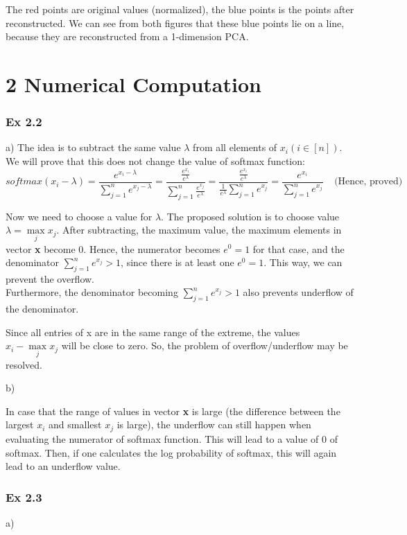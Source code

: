 \documentclass{article}
\begin{document}
\newpage
The red points are original values (normalized), the blue points is the points after reconstructed. We can see from both figures that these blue points lie on a line, because they are reconstructed from a 1-dimension PCA.

\section*{2 Numerical Computation}
\subsubsection*{Ex 2.2}
a)
The idea is to subtract the same value $\lambda$ from all elements of $x_i (i \in [n])$. We will prove that this does not change the value of softmax function:
$$softmax(x_i - \lambda) = \frac{e^{x_i - \lambda}}{\sum\limits_{j=1}^{n}e^{x_j - \lambda}} = \frac{\frac{e^{x_i}}{e^{\lambda}}}{\sum\limits_{j=1}^{n}\frac{e^{x_j}}{e^{\lambda}}} = \frac{\frac{e^{x_i}}{e^{\lambda}}}{\frac{1}{e^{\lambda}} \sum\limits_{j=1}^{n}e^{x_j}} = \frac{e^{x_i}}{\sum\limits_{j=1}^{n}e^{x_j}}\ \ \ \ \ \text{(Hence, proved)}$$

Now we need to choose a value for $\lambda$. The proposed solution is to choose value $\lambda = \max\limits_{j}x_{j}$. After subtracting, the maximum value, the maximum elements in vector \textbf{x} become 0. Hence, the numerator becomes $e^0=1$ for that case, and the denominator $\sum\limits_{j=1}^{n}e^{x_j} > 1$, since there is at least one $e^0 = 1$. This way, we can prevent the overflow. \\
Furthermore, the denominator becoming $\sum\limits_{j=1}^{n}e^{x_j} > 1$ also prevents underflow of the denominator.

Since all entries of x are in the same range of the extreme, the values $x_{i} -\max\limits_{j}x_{j}$ will be close to zero. So, the problem of overflow/underflow may be resolved. 

b)

In case that the range of values in vector \textbf{x} is large (the difference between the largest $x_i$ and smallest $x_j$ is large), the underflow can still happen when evaluating the numerator of softmax function. This will lead to a value of 0 of softmax. Then, if one calculates the log probability of softmax, this will again lead to an underflow value.

\subsubsection*{Ex 2.3}
a) 
\end{document}
